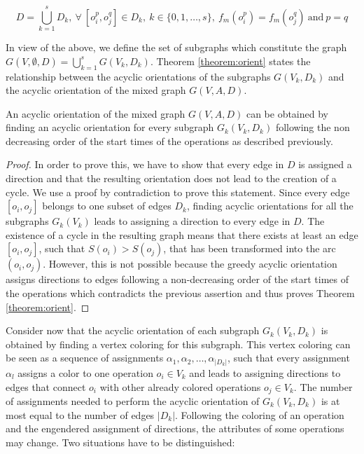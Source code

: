 \begin{equation}
D = \bigcup_{k=1}^s D_k,\ \forall\ [o_i^p, o_j^q] \in D_k,\ k \in \{0, 1, \ldots, s\},\ f_m(o_i^p)=f_m(o_j^q)\ \text{and}\ p = q
\label{eq:opsubset}
\end{equation}

In view of the above, we define the set of subgraphs which constitute the graph $G(V,\emptyset,D) = \bigcup_{k=1}^s G(V_k,D_k)$. Theorem \ref{theorem:orient} states the relationship between the acyclic orientations of the subgraphs $G(V_k,D_k)$ and the acyclic orientation of the mixed graph $G(V,A,D)$.

\begin{theorem}
An acyclic orientation of the mixed graph $G(V,A,D)$ can be obtained by finding an acyclic orientation for every subgraph $G_k(V_k,D_k)$ following the non decreasing order of the start times of the operations as described previously.
\label{theorem:orient}
\end{theorem}

\begin{proof}
In order to prove this, we have to show that every edge in $D$ is assigned a	direction and that the resulting orientation does not lead to the creation of a cycle. We use a proof by contradiction to prove this statement. Since every edge $[o_i, o_j]$ belongs to one subset of edges $D_k$, finding acyclic orientations for all the subgraphs $G_k(V_k)$ leads to assigning a direction to every edge in $D$. The existence of a cycle in the resulting graph means that there exists at least an edge $[o_i,o_j]$, such that $S(o_i) > S(o_j)$, that has been transformed into the arc $(o_i,o_j)$. However, this is not possible because the greedy acyclic orientation assigns directions to edges following a non-decreasing order of the start times of the operations which contradicts the previous assertion and thus proves Theorem \ref{theorem:orient}.
\end{proof}

Consider now that the acyclic orientation of each subgraph $G_k(V_k,D_k)$ is obtained by finding a vertex coloring for this subgraph. This vertex coloring can be seen as a sequence of assignments $\alpha_1, \alpha_2, \ldots, \alpha_{|D_k|}$, such that every assignment $\alpha_l$ assigns a color to one operation $o_i \in V_k$ and leads to assigning directions to edges that connect $o_i$ with other already colored operations $o_j \in V_k$. The number of assignments needed to perform the acyclic orientation of $G_k(V_k,D_k)$ is at most equal to the number of edges $|D_k|$. Following the coloring of an operation and the engendered assignment of directions, the attributes of some operations may change. Two situations have to be distinguished:


